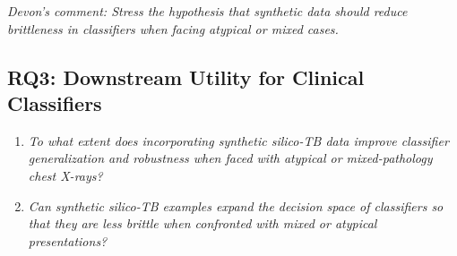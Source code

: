 \footnotesize{\textit{Devon’s comment: Stress the hypothesis that synthetic data should reduce brittleness in classifiers when facing atypical or mixed cases.}} \normalsize


\subsection{RQ3: Downstream Utility for Clinical Classifiers}
\label{subsec:rq3}
\begin{enumerate}
    \item \textit{To what extent does incorporating synthetic silico-TB data improve classifier generalization and robustness when faced with atypical or mixed-pathology chest X-rays?}
    \item \textit{Can synthetic silico-TB examples expand the decision space of classifiers so that they are less brittle when confronted with mixed or atypical presentations?}
\end{enumerate}

